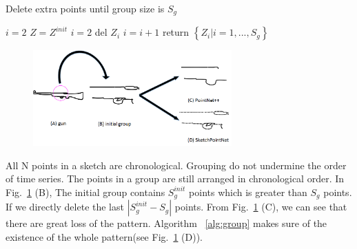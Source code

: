 \begin{algorithm}
\label{alg:group}
    \caption{Delete extra points until group size is $S_g$}
    $i = 2$\;
    $Z = Z^{init}$\;
    {
        {
            $i = 2$\;
        }
        del $Z_i$\;
        $i = i+1$\;
    }
    return $\left\{ Z_i| i = 1, ..., S_g \right\}$\;
\end{algorithm}

\begin{figure}
    \center
    \includegraphics[width=3in]{images/group.png}
    \label{fig:group}
\end{figure}

All N points in a sketch are chronological. Grouping do not undermine the order of time series. The points in a group are still arranged in chronological order. In Fig.~\ref{fig:group} (B), The initial group contains $S_g^{init}$ points which is greater than $S_g$ points. If we directly delete the last $|S_g^{init}-S_g|$ points. From Fig.~\ref{fig:group} (C), we can see that there are great loss of the pattern.  Algorithm ~\ref{alg:group} makes sure of the existence of the whole pattern(see Fig.~\ref{fig:group} (D)).


